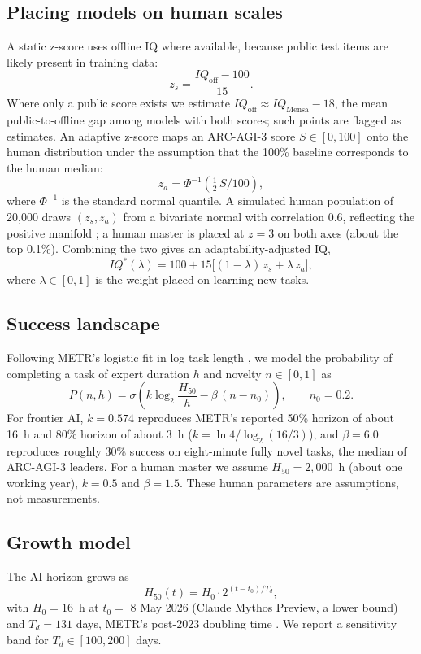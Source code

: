 \documentclass[11pt]{article}
\begin{document}
\subsection{Placing models on human scales}
A static z-score uses offline IQ where available, because public test items are likely present in training data:
\begin{equation}
z_s=\frac{IQ_{\text{off}}-100}{15}.
\end{equation}
Where only a public score exists we estimate $IQ_{\text{off}}\approx IQ_{\text{Mensa}}-18$, the mean public-to-offline gap among models with both scores; such points are flagged as estimates. An adaptive z-score maps an ARC-AGI-3 score $S\in[0,100]$ onto the human distribution under the assumption that the 100\% baseline corresponds to the human median:
\begin{equation}
z_a=\Phi^{-1}\!\left(\tfrac{1}{2}\,S/100\right),
\end{equation}
where $\Phi^{-1}$ is the standard normal quantile. A simulated human population of 20,000 draws $(z_s,z_a)$ from a bivariate normal with correlation $0.6$, reflecting the positive manifold \citep{spearman1904}; a human master is placed at $z=3$ on both axes (about the top 0.1\%). Combining the two gives an adaptability-adjusted IQ,
\begin{equation}
IQ^{*}(\lambda)=100+15\big[(1-\lambda)\,z_s+\lambda\,z_a\big],
\end{equation}
where $\lambda\in[0,1]$ is the weight placed on learning new tasks.

\subsection{Success landscape}
Following METR's logistic fit in log task length \citep{kwa2025}, we model the probability of completing a task of expert duration $h$ and novelty $n\in[0,1]$ as
\begin{equation}
P(n,h)=\sigma\!\left(k\log_2\frac{H_{50}}{h}-\beta\,(n-n_0)\right),\qquad n_0=0.2.
\end{equation}
For frontier AI, $k=0.574$ reproduces METR's reported 50\% horizon of about 16~h and 80\% horizon of about 3~h ($k=\ln 4/\log_2(16/3)$), and $\beta=6.0$ reproduces roughly 30\% success on eight-minute fully novel tasks, the median of ARC-AGI-3 leaders. For a human master we assume $H_{50}=2{,}000$~h (about one working year), $k=0.5$ and $\beta=1.5$. These human parameters are assumptions, not measurements.

\subsection{Growth model}
The AI horizon grows as
\begin{equation}
H_{50}(t)=H_0\cdot 2^{(t-t_0)/T_d},
\end{equation}
with $H_0=16$~h at $t_0=$ 8 May 2026 (Claude Mythos Preview, a lower bound) and $T_d=131$ days, METR's post-2023 doubling time \citep{metrth}. We report a sensitivity band for $T_d\in[100,200]$ days.
\end{document}
